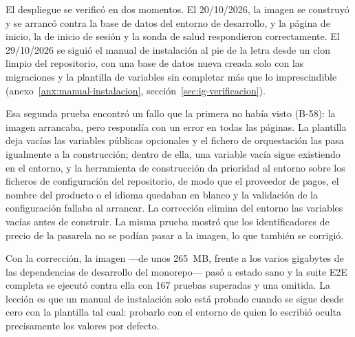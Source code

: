 El despliegue se verificó en dos momentos. El 20/10/2026, la imagen se
construyó y se arrancó contra la base de datos del entorno de desarrollo, y
la página de inicio, la de inicio de sesión y la sonda de salud respondieron
correctamente. El 29/10/2026 se siguió el manual de instalación al pie de la
letra desde un clon limpio del repositorio, con una base de datos nueva
creada solo con las migraciones y la plantilla de variables sin completar más
que lo imprescindible (anexo~\ref{anx:manual-instalacion},
sección~\ref{sec:ig-verificacion}).

Esa segunda prueba encontró un fallo que la primera no había visto (B-58): la
imagen arrancaba, pero respondía con un error en todas las páginas. La
plantilla deja vacías las variables públicas opcionales y el fichero de
orquestación las pasa igualmente a la construcción; dentro de ella, una
variable vacía sigue existiendo en el entorno, y la herramienta de
construcción da prioridad al entorno sobre los ficheros de configuración del
repositorio, de modo que el proveedor de pagos, el nombre del producto o el
idioma quedaban en blanco y la validación de la configuración fallaba al
arrancar. La corrección elimina del entorno las variables vacías antes de
construir. La misma prueba mostró que los identificadores de precio de la
pasarela no se podían pasar a la imagen, lo que también se corrigió.

Con la corrección, la imagen ---de unos 265~MB, frente a los varios
gigabytes de las dependencias de desarrollo del monorepo--- pasó a estado
sano y la suite E2E completa se ejecutó contra ella con 167 pruebas
superadas y una omitida. La lección es que un manual de instalación solo está
probado cuando se sigue desde cero con la plantilla tal cual: probarlo con el
entorno de quien lo escribió oculta precisamente los valores por defecto.
